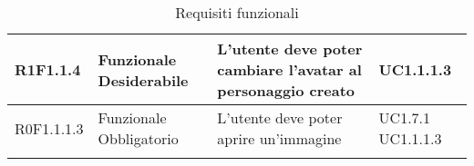\begin{center}
\begin{longtable}{| p{2.5cm} | p{3cm} | p{5.25cm} | p{2cm} |}
R1F1.1.4 & Funzionale \newline Desiderabile & L'utente deve poter cambiare l'avatar al personaggio creato & UC1.1.1.3 \\ \hline

R0F1.1.1.3 & Funzionale \newline Obbligatorio & L'utente deve poter aprire un'immagine & UC1.7.1 \newline UC1.1.1.3 \\ \hline


\caption{Requisiti funzionali}
\end{longtable}

\egroup
\end{center}
